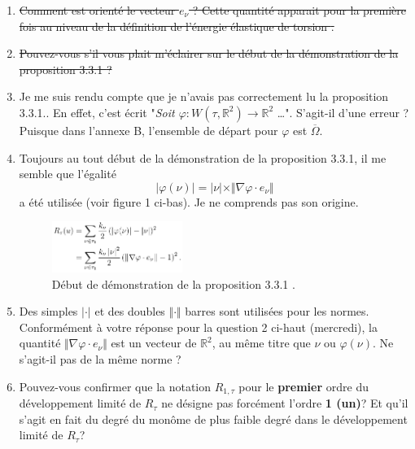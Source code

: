 \documentclass[
  french,
	11pt, %
]{fphw}
\begin{document}
\begin{enumerate}
  \item \sout{Comment est orienté le vecteur $e_\nu$ ? Cette quantité apparait pour la première fois au niveau de la définition de l'énergie élastique de torsion \parencite[p.91]{balasoiu2020halthesis}.} 
  \item \sout{Pouvez-vous s'il vous plait m'éclairer sur le début de la démonstration de la proposition 3.3.1 \parencite[p.93]{balasoiu2020halthesis} ?}
  \item Je me suis rendu compte que je n'avais pas correctement lu la proposition 3.3.1.. En effet, c'est écrit "\textit{Soit $\varphi : W(\tau, \mathbb{R}^2) \rightarrow \mathbb{R}^2$} \ldots ". S'agit-il d'une erreur ? Puisque dans l'annexe B, l'ensemble de départ pour $\varphi$ est $\overline{\Omega}$.
  \item Toujours au tout début de la démonstration de la proposition 3.3.1, il me semble que l'égalité $$\vert \varphi (\nu) \vert = \vert \nu \vert \times \Vert \nabla \varphi \cdot e_{\nu} \Vert$$ a été utilisée (voir figure 1 ci-bas). Je ne comprends pas son origine.
  \begin{figure}[H]
    \centering
    \includegraphics[width=0.4\textwidth]{Propo12.png}
    \caption{Début de démonstration de la proposition 3.3.1 \parencite[p.93]{balasoiu2020halthesis}.}
  \end{figure}
  \item Des simples $\vert \cdot \vert$ et des doubles $\Vert \cdot \Vert$ barres sont utilisées pour les normes. Conformément à votre réponse pour la question 2 ci-haut (mercredi), la quantité $\Vert \nabla \varphi \cdot e_{\nu} \Vert$ est un vecteur de $\mathbb{R}^2$, au même titre que $\nu$ ou $\varphi(\nu)$. Ne s'agit-il pas de la même norme ?
  \item Pouvez-vous confirmer que la notation $R_{1,\tau}$ pour le \textbf{premier} ordre du développement limité de $R_{\tau}$ ne désigne pas forcément l'ordre \textbf{1 (un)}? Et qu'il s'agit en fait du degré du monôme de plus faible degré dans le développement limité de $R_{\tau}$?

\end{enumerate}
\end{document}
